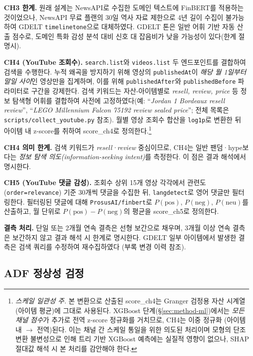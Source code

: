 \documentclass[11pt, a4paper, twocolumn]{article}
\begin{document}
\textbf{CH3 한계.} 원래 설계는 NewsAPI로 수집한 도메인 텍스트에
FinBERT를 적용하는 것이었으나, NewsAPI 무료 플랜의 30일 역사 자료
제한으로 4년 길이 수집이 불가능하여 GDELT \texttt{timelinetone}으로
대체하였다. GDELT 톤은 일반 어휘 기반 자동 산출 점수로, 도메인 특화
감성 분석 대비 신호 대 잡음비가 낮을 가능성이 있다(한계 절 명시).

\textbf{CH4 (YouTube 조회수).} \texttt{search.list}와
\texttt{videos.list} 두 엔드포인트를 결합하여 검색을 수행한다. 누적
왜곡을 방지하기 위해 영상의 \texttt{publishedAt}이 \emph{해당 월
1일부터 말일 사이}인 영상만을 집계하며, 이를 위해
\texttt{publishedAfter}와 \texttt{publishedBefore} 파라미터로 구간을
강제한다. 검색 키워드는 자산-아이템별로 \emph{resell, review, price}
등 정보 탐색형 어휘를 결합하여 사전에 고정하였다(예: ``\textit{Jordan
1 Bordeaux resell review}'', ``\textit{LEGO Millennium Falcon 75192
review sealed price}''; 전체 목록은 \texttt{scripts/collect\_youtube.py}
참조). 월별 영상 조회수 합산을
\texttt{log1p}로 변환한 뒤 아이템 내 z-score를 취하여 \textsf{score\_ch4}로
정의한다.\footnote{\textit{스케일 일관성 주.} 본 변환으로 산출된
\textsf{score\_ch4}는 Granger 검정용 자산 시계열(아이템 평균)에 그대로
사용된다. XGBoost 단계(\S\ref{sec:method-ml})에서는 \emph{모든 채널
점수}가 추가로 전역 z-score 정규화를 거치므로, CH4는 이중 정규화
(아이템 내 $\to$ 전역)된다. 이는 채널 간 스케일 통일을 위한 의도된
처리이며 모형의 단조 변환 불변성으로 인해 트리 기반 XGBoost 예측에는
실질적 영향이 없으나, SHAP 절대값 해석 시 본 처리를 감안해야 한다.}

\textbf{CH4 의미 한계.} 검색 키워드가 \emph{resell·review} 중심이므로,
CH4는 일반 팬덤·hype보다는 \emph{정보 탐색 의도(information-seeking
intent)}를 측정한다. 이 점은 결과 해석에서 명시한다.

\textbf{CH5 (YouTube 댓글 감성).} 조회수 상위 15개 영상 각각에서
관련도(\texttt{order=relevance}) 기준 30개씩 댓글을 수집한 뒤,
\texttt{langdetect}로 영어 댓글만 필터링한다. 필터링된 댓글에 대해
\texttt{ProsusAI/finbert}\citep{araci2019finbert}로 $P(\text{pos})$,
$P(\text{neg})$, $P(\text{neu})$를 산출하고, 월 단위로
$P(\text{pos})-P(\text{neg})$의 평균을 \textsf{score\_ch5}로 정의한다.

\textbf{결측 처리.} 단일 또는 2개월 연속 결측은 선형 보간으로 채우며,
3개월 이상 연속 결측은 보간하지 않고 결과 해석 시 한계로 명시한다.
GDELT 일부 아이템에서 발생한 결측은 검색 쿼리를 수정하여 재수집하였다
(부록 변경 이력 참조).

\subsection{ADF 정상성 검정}\label{sec:method-adf}
\end{document}
